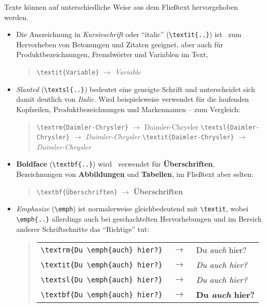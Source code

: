 Texte können auf unterschiedliche Weise aus dem Fließtext hervorgehoben werden.
\begin{itemize}
%
\item Die Auszeichnung in \textit{Kursivschrift} oder "`italic"' (\verb!\textit{..}!) ist \va\ zum Hervorheben von
Betonungen und Zitaten geeignet, aber auch für
Produktbezeichnungen, Fremdwörter und Variablen im Text, \zB
%
\begin{quote}
\verb!\textit{Variable}! $\rightarrow$ \textit{Variable}
\end{quote}
%
\item {\sl Slanted} %
(\verb!\textsl{..}!) bedeutet eine geneigte Schrift und
unterscheidet sich damit deutlich von \textit{Italic}. Wird
beispielsweise verwendet für die laufenden Kopfzeilen,
Produktbezeichnungen und Markennamen -- zum Vergleich:
%
\begin{quote}
\verb!\textrm{Daimler-Chrysler}! $\rightarrow$ \textrm{Daimler-Chrysler} \newline%
\verb!\textsl{Daimler-Chrysler}! $\rightarrow$ \textsl{Daimler-Chrysler} \newline%
\verb!\textit{Daimler-Chrysler}! $\rightarrow$ \textit{Daimler-Chrysler}
\end{quote}
%
\item \textbf{Boldface} (\verb!\textbf{..}!) wird \ia\ verwendet für 
\textbf{Überschriften}, Bezeichnungen von \textbf{Abbildungen} und 
\textbf{Tabellen}, im Fließtext aber selten:
%
\begin{quote}
\verb!\textbf{Überschriften}! $\rightarrow$ \textbf{Überschriften}
\end{quote}
%
\item \emph{Emphasize} (\verb!\emph!) %
ist normalerweise gleichbedeutend mit \verb!\textit!, wobei
\verb!\emph{..}! allerdings auch bei geschachtelten
Hervorhebungen und im Bereich anderer Schriftschnitte das
"`Richtige"' tut: 
%
\begin{quote}
\setlength{\tabcolsep}{0pt}%
\begin{tabular}{lcl}
\verb!\textrm{Du \emph{auch} hier?}! & $\;\rightarrow\;$ &
    \textrm{Du \emph{auch} hier?}
\\
\verb!\textit{Du \emph{auch} hier?}! & $\;\rightarrow\;$ &
    \textit{Du \emph{auch} hier?} 
\\
\verb!\textsl{Du \emph{auch} hier?}! & $\;\rightarrow\;$ & 
    \textsl{Du \emph{auch} hier?}
\\
\verb!\textbf{Du \emph{auch} hier?}! & $\;\rightarrow\;$ & 
    \textbf{Du \emph{auch} hier?}

\end{tabular}
\end{quote}
\end{itemize}
